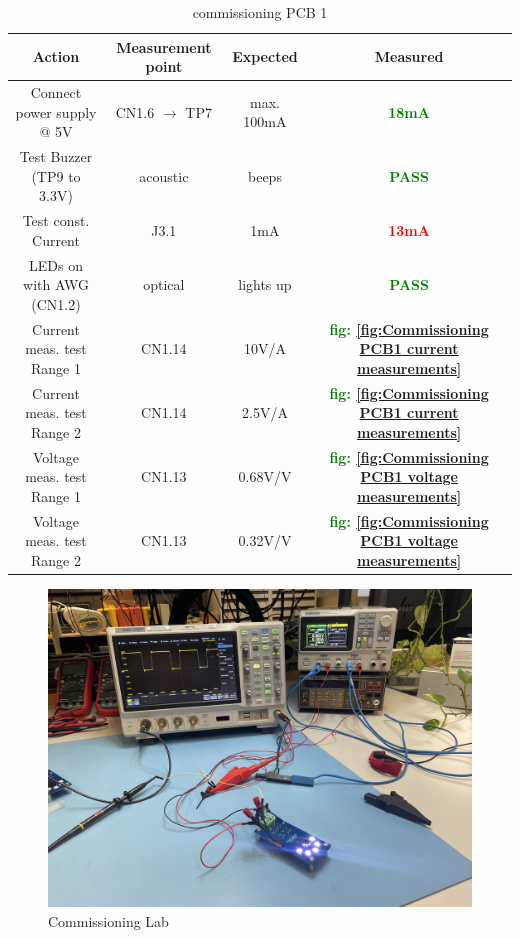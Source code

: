 \begin{table}[H]
	\centering
	\label{tab:commissioning PCB 1}
\begin{tabular}{|| c | c | c | c ||} 
\hline
Action & Measurement point & Expected & Measured \\ [0.5ex] 
\hline\hline
Connect power supply @ 5V & CN1.6 \(\rightarrow\) TP7 & max. 100mA & \textcolor{Green}{\textbf{18mA}} \\
\hline
Test Buzzer (TP9 to 3.3V) & acoustic & beeps & \textcolor{Green}{\textbf{PASS}} \\
\hline
Test const. Current & J3.1 & 1mA & \textcolor{Red}{\textbf{13mA}} \\
\hline
LEDs on with AWG (CN1.2) & optical & lights up & \textcolor{Green}{\textbf{PASS}} \\
\hline
Current meas. test Range 1 & CN1.14 & 10V/A & \textcolor{Green}{\textbf{fig: \ref{fig:Commissioning PCB1 current measurements}}} \\
\hline
Current meas. test Range 2 & CN1.14 & 2.5V/A & \textcolor{Green}{\textbf{fig: \ref{fig:Commissioning PCB1 current measurements}}} \\
\hline
Voltage meas. test Range 1 & CN1.13 & 0.68V/V & \textcolor{Green}{\textbf{fig: \ref{fig:Commissioning PCB1 voltage measurements}}} \\
\hline
Voltage meas. test Range 2 & CN1.13 & 0.32V/V & \textcolor{Green}{\textbf{fig: \ref{fig:Commissioning PCB1 voltage measurements}}} \\
\hline
\end{tabular}
	\caption{commissioning PCB 1}
\end{table}



\begin{figure}[H]
	\centering
	\includegraphics[width=15cm]{Resources/comissioning_lab_build.JPEG}
	\caption{Commissioning Lab}
	\label{fig:Commissioning Lab}
\end{figure}



